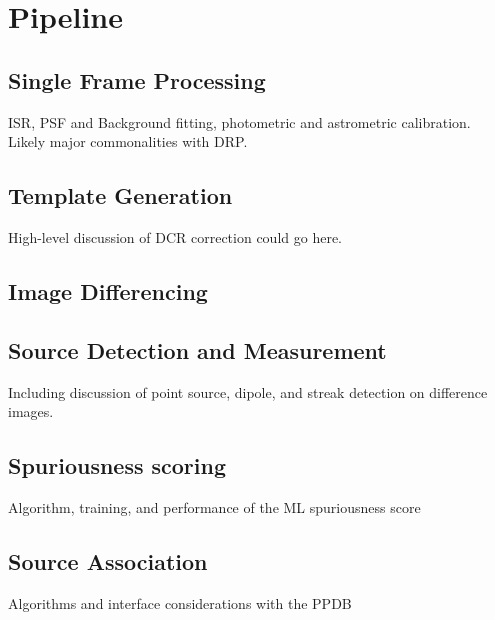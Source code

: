 
\section{Pipeline}


\subsection{Single Frame Processing}


ISR, PSF and Background fitting, photometric and astrometric calibration.  Likely major commonalities with DRP.

\subsection{Template Generation}


High-level discussion of DCR correction could go here.

\subsection{Image Differencing}

\subsection{Source Detection and Measurement}

Including discussion of point source, dipole, and streak detection on difference images.  


\subsection{Spuriousness scoring}

Algorithm, training, and performance of the ML spuriousness score

\subsection{Source Association}

Algorithms and interface considerations with the PPDB

